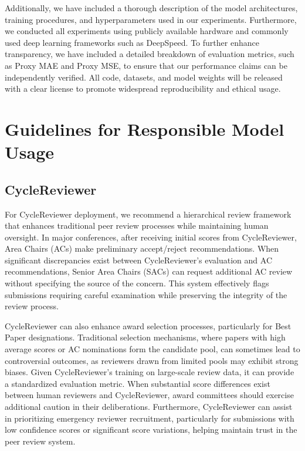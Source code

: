 \documentclass{article} %
\begin{document}
Additionally, we have included a thorough description of the model architectures, training procedures, and hyperparameters used in our experiments. Furthermore, we conducted all experiments using publicly available hardware and commonly used deep learning frameworks such as DeepSpeed. To further enhance transparency, we have included a detailed breakdown of evaluation metrics, such as Proxy MAE and Proxy MSE, to ensure that our performance claims can be independently verified. All code, datasets, and model weights will be released with a clear license to promote widespread reproducibility and ethical usage.




\appendix
\section{Guidelines for Responsible Model Usage}
\label{appropriate}

\subsection{CycleReviewer}
For CycleReviewer deployment, we recommend a hierarchical review framework that enhances traditional peer review processes while maintaining human oversight. In major conferences, after receiving initial scores from CycleReviewer, Area Chairs (ACs) make preliminary accept/reject recommendations. When significant discrepancies exist between CycleReviewer's evaluation and AC recommendations, Senior Area Chairs (SACs) can request additional AC review without specifying the source of the concern. This system effectively flags submissions requiring careful examination while preserving the integrity of the review process.

CycleReviewer can also enhance award selection processes, particularly for Best Paper designations. Traditional selection mechanisms, where papers with high average scores or AC nominations form the candidate pool, can sometimes lead to controversial outcomes, as reviewers drawn from limited pools may exhibit strong biases. Given CycleReviewer's training on large-scale review data, it can provide a standardized evaluation metric. When substantial score differences exist between human reviewers and CycleReviewer, award committees should exercise additional caution in their deliberations. Furthermore, CycleReviewer can assist in prioritizing emergency reviewer recruitment, particularly for submissions with low confidence scores or significant score variations, helping maintain trust in the peer review system.
\end{document}

